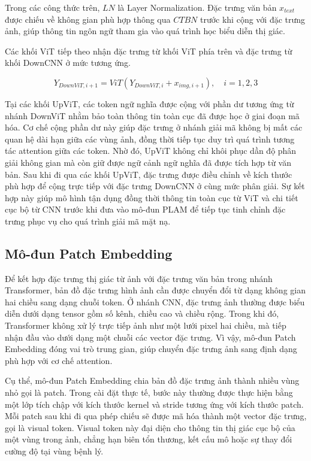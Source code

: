 Trong các công thức trên, $LN$ là Layer Normalization. Đặc trưng văn bản $x_{text}$ được chiếu về không gian phù hợp thông qua $CTBN$ trước khi cộng với đặc trưng ảnh, giúp thông tin ngôn ngữ tham gia vào quá trình học biểu diễn thị giác.

Các khối ViT tiếp theo nhận đặc trưng từ khối ViT phía trên và đặc trưng từ khối DownCNN ở mức tương ứng.

\[
    Y_{DownViT, i+1} = ViT(Y_{DownViT, i} + x_{img, i + 1}), \quad i = 1, 2, 3
\]

Tại các khối UpViT, các token ngữ nghĩa được cộng với phần dư tương ứng từ nhánh DownViT nhằm bảo toàn thông tin toàn cục đã được học ở giai đoạn mã hóa. Cơ chế cộng phần dư này giúp đặc trưng ở nhánh giải mã không bị mất các quan hệ dài hạn giữa các vùng ảnh, đồng thời tiếp tục duy trì quá trình tương tác attention giữa các token. Nhờ đó, UpViT không chỉ khôi phục dần độ phân giải không gian mà còn giữ được ngữ cảnh ngữ nghĩa đã được tích hợp từ văn bản. Sau khi đi qua các khối UpViT, đặc trưng được điều chỉnh về kích thước phù hợp để cộng trực tiếp với đặc trưng DownCNN ở cùng mức phân giải. Sự kết hợp này giúp mô hình tận dụng đồng thời thông tin toàn cục từ ViT và chi tiết cục bộ từ CNN trước khi đưa vào mô-đun PLAM để tiếp tục tinh chỉnh đặc trưng phục vụ cho quá trình giải mã mặt nạ.

\subsection{Mô-đun Patch Embedding}
Để kết hợp đặc trưng thị giác từ ảnh với đặc trưng văn bản trong nhánh Transformer, bản đồ đặc trưng hình ảnh cần được chuyển đổi từ dạng không gian hai chiều sang dạng chuỗi token. Ở nhánh CNN, đặc trưng ảnh thường được biểu diễn dưới dạng tensor gồm số kênh, chiều cao và chiều rộng. Trong khi đó, Transformer không xử lý trực tiếp ảnh như một lưới pixel hai chiều, mà tiếp nhận đầu vào dưới dạng một chuỗi các vector đặc trưng. Vì vậy, mô-đun Patch Embedding đóng vai trò trung gian, giúp chuyển đặc trưng ảnh sang định dạng phù hợp với cơ chế attention.

Cụ thể, mô-đun Patch Embedding chia bản đồ đặc trưng ảnh thành nhiều vùng nhỏ gọi là patch. Trong cài đặt thực tế, bước này thường được thực hiện bằng một lớp tích chập với kích thước kernel và stride tương ứng với kích thước patch. Mỗi patch sau khi đi qua phép chiếu sẽ được mã hóa thành một vector đặc trưng, gọi là visual token. Visual token này đại diện cho thông tin thị giác cục bộ của một vùng trong ảnh, chẳng hạn biên tổn thương, kết cấu mô hoặc sự thay đổi cường độ tại vùng bệnh lý.

